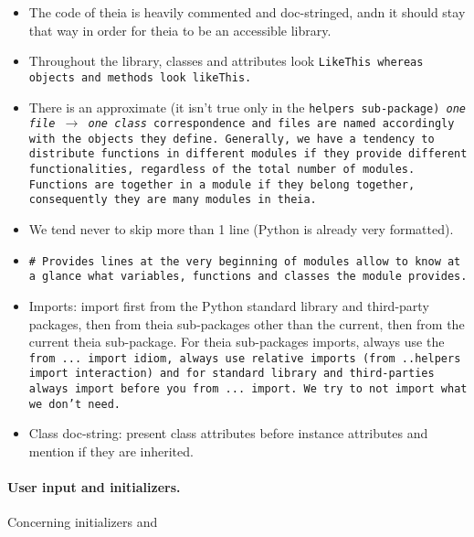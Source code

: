 \documentclass{article}
\begin{document}
\begin{itemize}
\item The code of theia is heavily commented and doc-stringed, andn it should stay that way in order for theia to be an accessible library.

\item Throughout the library, classes and attributes look \tt{LikeThis} whereas objects and methods look \tt{likeThis}.

\item There is an approximate (it isn't true only in the \tt{helpers} sub-package) \textit{one file} $\rightarrow$ \textit{one class} correspondence and files are named accordingly with the objects they define. Generally, we have a tendency to distribute functions in different modules if they provide different functionalities, regardless of the total number of modules. Functions are together in a module if they belong together, consequently they are many modules in theia.

\item We tend never to skip more than 1 line (Python is already very formatted).

\item \tt{\# Provides} lines at the very beginning of modules allow to know at a glance what variables, functions and classes the module provides.

\item Imports: import first from the Python standard library and third-party packages, then from theia sub-packages other than the current, then from the current theia sub-package. For theia sub-packages imports, always use the \tt{from ... import} idiom, always use relative imports (\tt{from ..helpers import interaction}) and for standard library and third-parties always \tt{import} before you \tt{from ... import}. We try to not import what we don't need.

\item Class doc-string: present class attributes before instance attributes and mention if they are inherited.
\end{itemize}

\paragraph{User input and initializers.}Concerning initializers and 
\end{document}
